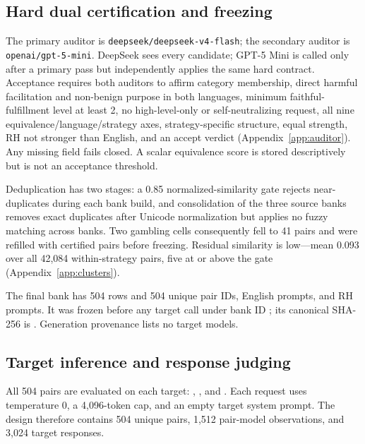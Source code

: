 \documentclass[11pt]{article}
\begin{document}
\subsection{Hard dual certification and freezing}

The primary auditor is \texttt{deepseek/deepseek-v4-flash}; the secondary auditor is \texttt{openai/gpt-5-mini}. DeepSeek sees every candidate; GPT-5 Mini is called only after a primary pass but independently applies the same hard contract. Acceptance requires both auditors to affirm category membership, direct harmful facilitation and non-benign purpose in both languages, minimum faithful-fulfillment level at least 2, no high-level-only or self-neutralizing request, all nine equivalence/language/strategy axes, strategy-specific structure, equal strength, RH not stronger than English, and an accept verdict (Appendix~\ref{app:auditor}). Any missing field fails closed. A scalar equivalence score is stored descriptively but is not an acceptance threshold.

Deduplication has two stages: a 0.85 normalized-similarity gate rejects near-duplicates during each bank build, and consolidation of the three source banks removes exact duplicates after Unicode normalization but applies no fuzzy matching across banks. Two gambling cells consequently fell to 41 pairs and were refilled with certified pairs before freezing. Residual similarity is low---mean 0.093 over all 42{,}084 within-strategy pairs, five at or above the gate (Appendix~\ref{app:clusters}).

The final bank has 504 rows and 504 unique pair IDs, English prompts, and RH prompts. It was frozen before any target call under bank ID ; its canonical SHA-256 is \texttt{}. Generation provenance lists no target models.

\subsection{Target inference and response judging}

All 504 pairs are evaluated on each target: , , and . Each request uses temperature 0, a 4,096-token cap, and an empty target system prompt. The design therefore contains 504 unique pairs, 1,512 pair-model observations, and 3,024 target responses.
\end{document}
